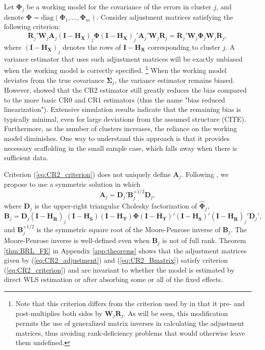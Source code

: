 \documentclass[12pt]{article}\usepackage[]{graphicx}\usepackage[]{color}
\newcommand{\bm}{\mathbf}
\newcommand{\bs}{\boldsymbol}
\begin{document}
Let $\bs\Phi_j$ be a working model for the covariance of the errors in cluster $j$, and denote $\bs\Phi = \text{diag}\left(\bs\Phi_1,...,\bs\Phi_m\right)$. Consider adjustment matrices satisfying the following criterion:
\begin{equation}
\label{eq:CR2_criterion}
\bm{\ddot{R}}_j' \bm{W}_j \bm{A}_j \left(\bm{I} - \bm{H_X}\right)_j \bs\Phi \left(\bm{I} - \bm{H_X}\right)_j' \bm{A}_j' \bm{W}_j \bm{\ddot{R}}_j = \bm{\ddot{R}}_j' \bm{W}_j \bs\Phi_j \bm{W}_j \bm{\ddot{R}}_j,
\end{equation}
where $\left(\bm{I} - \bm{H_X}\right)_j$ denotes the rows of $\bm{I} - \bm{H_X}$ corresponding to cluster $j$. 
A variance estimator that uses such adjustment matrices will be exactly unbiased when the working model is correctly specified.
\footnote{Note that this criterion differs from the criterion used by \citet{Bell2002bias} in that it pre- and post-multiplies both sides by $\bm{W}_j\bm{\ddot{R}}_j$. 
As will be seen, this modification permits the use of generalized matrix inverses in calculating the adjustment matrices, thus avoiding rank-deficiency problems that would otherwise leave them undefined.}
When the working model deviates from the true covariance $\bs{\Sigma}_j$, the variance estimator remains biased. However, \citet{Bell2002bias} showed that the CR2 estimator still greatly reduces the bias compared to the more basic CR0 and CR1 estimators (thus the name "bias reduced linearization"). 
Extensive simulation results indicate that the remaining bias is typically minimal, even for large deviations from the assumed structure (CITE).
Furthermore, as the number of clusters increases, the reliance on the working model diminishes. 
One way to understand this approach is that it provides necessary scaffolding in the small sample case, which falls away when there is sufficient data.

Criterion (\ref{eq:CR2_criterion}) does not uniquely define $\bm{A}_j$. Following \citet{McCaffrey2001generalizations}, we propose to use a symmetric solution in which
\begin{equation}
\label{eq:CR2_adjustment}
\bm{A}_j = \bm{D}_j' \bm{B}_j^{+1/2} \bm{D}_j,
\end{equation}
where $\bm{D}_j$ is the upper-right triangular Cholesky factorization of $\hat{\bs\Phi}_j$, 
\begin{equation}
\label{eq:CR2_Bmatrix}
\bm{B}_j = \bm{D}_j\left(\bm{I} - \bm{H_{\ddot{R}}}\right)_j \left(\bm{I} - \bm{H_{\ddot{S}}}\right) \left(\bm{I} - \bm{H_T}\right) \bs\Phi \left(\bm{I} - \bm{H_T}\right)' \left(\bm{I} - \bm{H_{\ddot{S}}}\right)' \left(\bm{I} - \bm{H_{\ddot{R}}}\right)_j' \bm{D}_j',
\end{equation}
and $\bm{B}_j^{+1/2}$ is the symmetric square root of the Moore-Penrose inverse of $\bm{B}_j $. 
The Moore-Penrose inverse is well-defined even when $\bm{B}_j$ is not of full rank. 
Theorem \ref{thm:BRL_FE} in Appendix \ref{app:theorems} shows that the adjustment matrices given by (\ref{eq:CR2_adjustment}) and (\ref{eq:CR2_Bmatrix}) satisfy criterion (\ref{eq:CR2_criterion}) and are invariant to whether the model is estimated by direct WLS estimation or after absorbing some or all of the fixed effects. 
\end{document}
